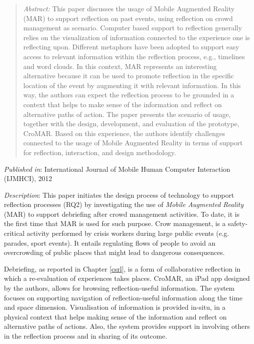 \begin{quote}
	\emph{Abstract:} This paper discusses the usage of Mobile Augmented Reality (MAR) to support reflection on past events, using reflection on crowd management as scenario. Computer based support to reflection generally relies on the visualization of information connected to the experience one is reflecting upon. Different metaphors have been adopted to support easy access to relevant information within the reflection process, e.g., timelines and word clouds. In this context, MAR represents an interesting alternative because it can be used to promote reflection in the specific location of the event by augmenting it with relevant information. In this way, the authors can expect the reflection process to be grounded in a context that helps to make sense of the information and reflect on alternative paths of action. The paper presents the scenario of usage, together with the design, development, and evaluation of the prototype, CroMAR. Based on this experience, the authors identify challenges connected to the usage of Mobile Augmented Reality in terms of support for reflection, interaction, and design methodology. 
\end{quote}

\emph{Published in}: International Journal of Mobile Human Computer Interaction (IJMHCI), 2012

\emph{Description}: This paper initiates the design process of technology to support reflection processes (RQ2) by investigating the use of \emph{Mobile Augmented Reality} (MAR) to support debriefing after crowd management activities. To date, it is the first time that MAR is used for such purpose. Crow management, is a safety-critical activity performed by crisis workers during large public events (e.g. parades, sport events). It entails regulating flows of people to avoid an overcrowding of public places that might lead to dangerous consequences. 

Debriefing, as reported in Chapter \ref{csrl}, is a form of collaborative reflection in which a re-evaluation of experiences takes places. CroMAR, an iPad app designed by the authors, allows for browsing reflection-useful information. The system focuses on supporting navigation of reflection-useful information along the time and space dimension. Visualisation of information is provided in-situ, in a physical context that helps making sense of the information and reflect on alternative paths of actions. Also, the system provides support in involving others in the reflection process and in sharing of its outcome.

